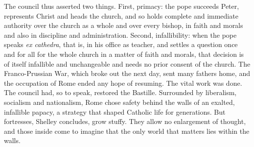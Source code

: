 The council thus asserted two things. First, primacy: the pope succeeds Peter, represents Christ and heads the church, and so holds complete and immediate authority over the church as a whole and over every bishop, in faith and morals and also in discipline and administration. Second, infallibility:
when the pope speaks \emph{ex cathedra}, that is, in his office as teacher, and settles a question once and for all for the whole church in a matter of faith and morals, that decision is of itself infallible and unchangeable and
needs no prior consent of the church. The Franco-Prussian War, which broke out the next day, sent
many fathers home, and the occupation of Rome ended any hope of resuming. The vital work was done.
The council had, so to speak, restored the Bastille. Surrounded by liberalism, socialism and
nationalism, Rome chose safety behind the walls of an exalted, infallible papacy, a strategy that
shaped Catholic life for generations. But fortresses, Shelley concludes, grow stuffy. They allow no
enlargement of thought, and those inside come to imagine that the only world that matters lies
within the walls.

\begin{keyfacts}
\end{keyfacts}
